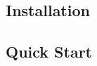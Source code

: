\hypertarget{installation}{%
\subsection{Installation}\label{installation}}

\begin{Shaded}
\begin{Highlighting}[]
\end{Highlighting}
\end{Shaded}

\hypertarget{quick-start}{%
\subsection{Quick Start}\label{quick-start}}

